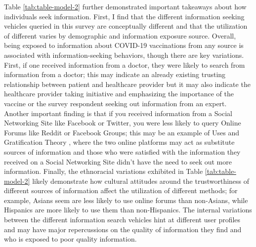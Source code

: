 Table \ref{tab:table-model-2} further demonstrated important takeaways about
how individuals seek information. First, I find that the different information
seeking vehicles queried in this survey are conceptually different and that the
utilization of different varies by demographic and information exposure source. 
Overall, being exposed to information about COVID-19 vaccinations from any 
source is associated with information-seeking behaviors,
though there are key variations. First, if one received information from a
doctor, they were likely to search from information from a doctor; this may
indicate an already existing trusting relationship between patient and
healthcare provider but it may also indicate the healthcare provider taking
initiative and emphasizing the importance of the vaccine or the survey respondent
seeking out information from an expert. Another important finding is that if you
received information from a Social Networking Site like Facebook or Twitter, you
were less likely to query Online Forums like Reddit or Facebook Groups; this may
be an example of Uses and Gratification Theory
\citep{blumlerUsesMassCommunications1974}, where the two online platforms may act as
substitute sources of information and those who were satisfied with the
information they received on a Social Networking Site didn't have the need to
seek out more information. Finally, the ethnoracial variations exhibited in
Table \ref{tab:table-model-2} likely demonstrate how cultural attitudes around
the trustworthiness of different sources of information affect the utilization
of different methods; for example, Asians seem are less likely to use online
forums than non-Asians, while Hispanics are more likely to use them than
non-Hispanics. The internal variations between the different information search
vehicles hint at different user profiles and may have major repercussions on the
quality of information they find and who is exposed to poor quality information.

